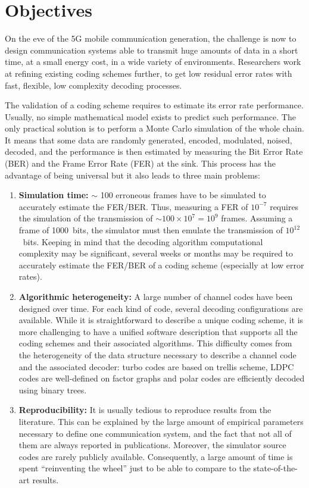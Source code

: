 \section{Objectives}

On the eve of the 5G mobile communication generation, the challenge is now to
design communication systems able to transmit huge amounts of data in a short
time, at a small energy cost, in a wide variety of environments. Researchers
work at refining existing coding schemes further, to get low residual error
rates with fast, flexible, low complexity decoding processes.

The validation of a coding scheme requires to estimate its error rate
performance. Usually, no simple mathematical model exists to predict such
performance. The only practical solution is to perform a Monte Carlo simulation
of the whole chain. It means that some data are randomly generated, encoded,
modulated, noised, decoded, and the performance is then estimated by measuring
the Bit Error Rate (BER) and the Frame Error Rate (FER) at the sink. This
process has the advantage of being universal but it also leads to three main
problems:

\begin{enumerate}
  \item \textbf{Simulation time:}
    $\sim$ 100 erroneous frames have to be simulated to accurately estimate the
    FER/BER. Thus, measuring a FER of $10^{-7}$ requires the simulation of the
    transmission of $\sim100\times 10^7=10^9$ frames. Assuming a frame of
    1000~bits, the simulator must then emulate the transmission of
    $10^{12}$~bits. Keeping in mind that the decoding algorithm computational
    complexity may be significant, several weeks or months may be required to
    accurately estimate the FER/BER of a coding scheme (especially at low error
    rates).

  \item \textbf{Algorithmic heterogeneity:} A large number of channel codes have
    been designed over time. For each kind of code, several decoding
    configurations are available. While it is straightforward to describe a
    unique coding scheme, it is more challenging to have a unified software
    description that supports all the coding schemes and their associated
    algorithms. This difficulty comes from the heterogeneity of the data
    structure necessary to describe a channel code and the associated decoder:
    turbo codes are based on trellis scheme, LDPC codes are well-defined on
    factor graphs and polar codes are efficiently decoded using binary trees.

  \item \textbf{Reproducibility:} It is usually tedious to reproduce results
    from the literature. This can be explained by the large amount of empirical
    parameters necessary to define one communication system, and the fact that
    not all of them are always reported in publications. Moreover, the simulator
    source codes are rarely publicly available. Consequently, a large amount of
    time is spent ``reinventing the wheel'' just to be able to compare to the
    state-of-the-art results.
\end{enumerate}

